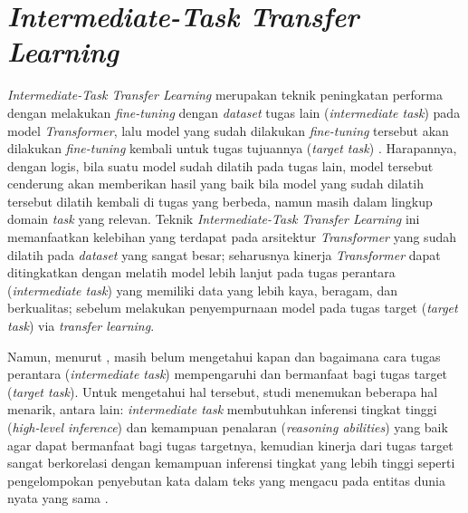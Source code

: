 \section{\emph{Intermediate-Task Transfer Learning}}
\emph{Intermediate-Task Transfer Learning} merupakan teknik peningkatan performa dengan melakukan \emph{fine-tuning} dengan \emph{dataset} tugas lain (\emph{intermediate task}) pada model \emph{Transformer}, lalu model yang sudah dilakukan \emph{fine-tuning} tersebut akan dilakukan \emph{fine-tuning} kembali untuk tugas tujuannya (\emph{target task}) \citep{pruksachatkun-etal-2020-intermediate}. Harapannya, dengan logis, bila suatu model sudah dilatih pada tugas lain, model tersebut cenderung akan memberikan hasil yang baik bila model yang sudah dilatih tersebut dilatih kembali di tugas yang berbeda, namun masih dalam lingkup domain \emph{task} yang relevan. Teknik \emph{Intermediate-Task Transfer Learning} ini memanfaatkan kelebihan yang terdapat pada arsitektur \emph{Transformer} yang sudah dilatih pada \emph{dataset} yang sangat besar; seharusnya kinerja \emph{Transformer} dapat ditingkatkan dengan melatih model lebih lanjut pada tugas perantara (\emph{intermediate task}) yang memiliki data yang lebih kaya, beragam, dan berkualitas; sebelum melakukan penyempurnaan model pada tugas target (\emph{target task}) via \emph{transfer learning}. 

Namun, menurut \citet{pruksachatkun-etal-2020-intermediate}, masih belum mengetahui kapan dan bagaimana cara tugas perantara (\emph{intermediate task}) mempengaruhi dan bermanfaat bagi tugas target (\emph{target task}). Untuk mengetahui hal tersebut, studi \citet{pruksachatkun-etal-2020-intermediate} menemukan beberapa hal menarik, antara lain: \emph{intermediate task} membutuhkan inferensi tingkat tinggi (\emph{high-level inference}) dan kemampuan penalaran (\emph{reasoning abilities}) yang baik agar dapat bermanfaat bagi tugas targetnya, kemudian kinerja dari tugas target sangat berkorelasi dengan kemampuan inferensi tingkat yang lebih tinggi seperti pengelompokan penyebutan kata dalam teks yang mengacu pada entitas dunia nyata yang sama \citep{coference-resolution}.

